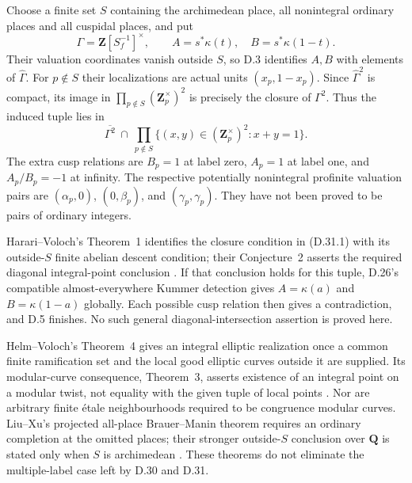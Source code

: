 Choose a finite set $S$ containing the archimedean place,
all nonintegral ordinary places and all cuspidal places,
and put
\[
 \Gamma=\mathbf Z[S_f^{-1}]^\times,\qquad
 A=s^\ast\kappa(t),\quad B=s^\ast\kappa(1-t).
\]
Their valuation coordinates vanish outside $S$, so
D.3 identifies $A,B$ with elements of $\widehat\Gamma$.
For $p\notin S$ their localizations are actual units
$(x_p,1-x_p)$.
Since $\widehat\Gamma^2$ is compact, its image in
$\prod_{p\notin S}(\mathbf Z_p^\times)^2$ is precisely
the closure of $\Gamma^2$. Thus the induced tuple lies in
\[
 \overline{\Gamma^2}\ \cap\
 \prod_{p\notin S}
 \{(x,y)\in(\mathbf Z_p^\times)^2:x+y=1\}.
 \tag{D.31.1}
\]
The extra cusp relations are $B_p=1$ at label zero,
$A_p=1$ at label one, and $A_p/B_p=-1$ at infinity.
The respective potentially nonintegral profinite
valuation pairs are $(\alpha_p,0)$, $(0,\beta_p)$,
and $(\gamma_p,\gamma_p)$.
They have not been proved to be pairs of ordinary integers.

Harari--Voloch's Theorem~1 identifies the closure condition
in \textup{(D.31.1)} with its outside-$S$ finite abelian
descent condition; their Conjecture~2 asserts the required
diagonal integral-point conclusion
\citep[Theorem~1, Conjecture~2, Remark~2.5]{D_HarariVoloch2010}.
If that conclusion holds for this tuple, D.26's compatible
almost-everywhere Kummer detection gives
$A=\kappa(a)$ and $B=\kappa(1-a)$ globally.
Each possible cusp relation then gives a contradiction,
and D.5 finishes. No such general diagonal-intersection
assertion is proved here.

Helm--Voloch's Theorem~4 gives an integral elliptic
realization once a common finite ramification set and
the local good elliptic curves outside it are supplied.
Its modular-curve consequence, Theorem~3, asserts
existence of an integral point on a modular twist,
not equality with the given tuple of local points
\citep[Theorems~3--4]{D_HelmVoloch2011}.
Nor are arbitrary finite \'etale neighbourhoods required
to be congruence modular curves.
Liu--Xu's projected all-place Brauer--Manin theorem
requires an ordinary completion at the omitted places;
their stronger outside-$S$ conclusion over $\mathbf Q$
is stated only when $S$ is archimedean
\citep[Definition~1.1, Theorems~1.2--1.4, Corollary~5.11]
{D_LiuXu2015}.
These theorems do not eliminate the multiple-label case
left by D.30 and D.31.
